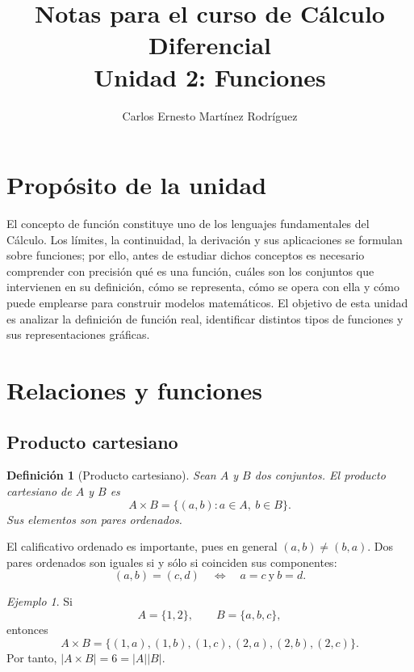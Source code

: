 \documentclass[12pt]{article}
\title{\textbf{Notas para el curso de Cálculo Diferencial}\\[0.35cm]
\Large Unidad 2: Funciones}
\author{Carlos Ernesto Martínez Rodríguez}
\date{}
\newtheorem{definicion}{Definición}[section]
\theoremstyle{remark}
\newtheorem{ejemplo}{Ejemplo}[section]
\begin{document}
\maketitle
\tableofcontents
\newpage

\section*{Propósito de la unidad}

El concepto de función constituye uno de los lenguajes fundamentales del Cálculo. Los límites, la continuidad, la derivación y sus aplicaciones se formulan sobre funciones; por ello, antes de estudiar dichos conceptos es necesario comprender con precisión qué es una función, cuáles son los conjuntos que intervienen en su definición, cómo se representa, cómo se opera con ella y cómo puede emplearse para construir modelos matemáticos. El objetivo de esta unidad es analizar la definición de función real, identificar distintos tipos de funciones y sus representaciones gráficas.

\section{Relaciones y funciones}

\subsection*{Producto cartesiano}

\begin{definicion}[Producto cartesiano]
Sean $A$ y $B$ dos conjuntos. El \emph{producto cartesiano} de $A$ y $B$ es
\[
A\times B=\{(a,b):a\in A,\ b\in B\}.
\]
Sus elementos son pares ordenados.
\end{definicion}

El calificativo ordenado es importante, pues en general $(a,b)\neq(b,a)$.
Dos pares ordenados son iguales si y sólo si coinciden sus componentes:
\[
(a,b)=(c,d)
\quad\Longleftrightarrow\quad
a=c\ \text{y}\ b=d.
\]

\begin{ejemplo}
Si
\[
A=\{1,2\},\qquad B=\{a,b,c\},
\]
entonces
\[
A\times B=
\{(1,a),(1,b),(1,c),(2,a),(2,b),(2,c)\}.
\]
Por tanto, $|A\times B|=6=|A||B|$.
\end{ejemplo}
\end{document}
